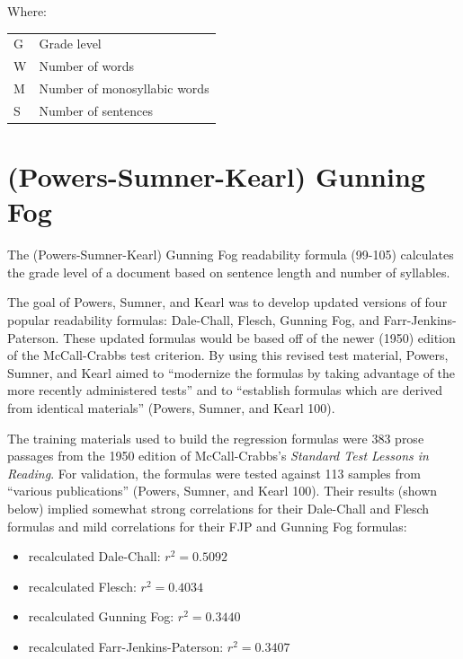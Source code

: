 \documentclass[
]{book}
\providecommand{\tightlist}{%
  \setlength{\itemsep}{0pt}\setlength{\parskip}{0pt}}
\theoremstyle{definition}
\theoremstyle{definition}
\theoremstyle{definition}
\theoremstyle{definition}
\theoremstyle{remark}
\begin{document}
Where:

\begin{longtable}[]{@{}
  >{\raggedright\arraybackslash}p{}
  >{\raggedright\arraybackslash}p{}@{}}
\toprule
\endhead
G & Grade level \\
W & Number of words \\
M & Number of monosyllabic words \\
S & Number of sentences \\
\bottomrule
\end{longtable}


\newpage

\hypertarget{psk-fog}{%
\section{\texorpdfstring{(Powers-Sumner-Kearl) Gunning Fog}{(Powers-Sumner-Kearl) Gunning Fog}}\label{psk-fog}}

The (Powers-Sumner-Kearl) Gunning Fog readability formula (99-105) calculates the grade level of a document based on sentence length and number of syllables.

The goal of Powers, Sumner, and Kearl was to develop updated versions of four popular readability formulas: Dale-Chall, Flesch, Gunning Fog, and Farr-Jenkins-Paterson. These updated formulas would be based off of the newer (1950) edition of the McCall-Crabbs test criterion. By using this revised test material, Powers, Sumner, and Kearl aimed to ``modernize the formulas by taking advantage of the more recently administered tests'' and to ``establish formulas which are derived from identical materials'' (Powers, Sumner, and Kearl 100).

The training materials used to build the regression formulas were 383 prose passages from the 1950 edition of McCall-Crabbs's \emph{Standard Test Lessons in Reading}. For validation, the formulas were tested against 113 samples from ``various publications'' (Powers, Sumner, and Kearl 100). Their results (shown below) implied somewhat strong correlations for their Dale-Chall and Flesch formulas and mild correlations for their FJP and Gunning Fog formulas:

\begin{itemize}
\tightlist
\item
  recalculated Dale-Chall: \(r^2 = 0.5092\)
\item
  recalculated Flesch: \(r^2 = 0.4034\)
\item
  recalculated Gunning Fog: \(r^2 = 0.3440\)
\item
  recalculated Farr-Jenkins-Paterson: \(r^2 = 0.3407\)
\end{itemize}
\end{document}
